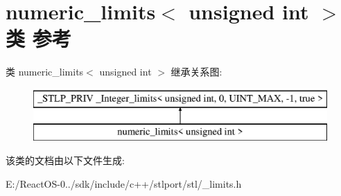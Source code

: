\hypertarget{classnumeric__limits_3_01unsigned_01int_01_4}{}\section{numeric\+\_\+limits$<$ unsigned int $>$类 参考}
\label{classnumeric__limits_3_01unsigned_01int_01_4}
类 numeric\+\_\+limits$<$ unsigned int $>$ 继承关系图\+:\begin{figure}[H]
\begin{center}
\leavevmode
\includegraphics[height=2.000000cm]{classnumeric__limits_3_01unsigned_01int_01_4}
\end{center}
\end{figure}


该类的文档由以下文件生成\+:\begin{DoxyCompactItemize}
\item 
E\+:/\+React\+O\+S-\/0../sdk/include/c++/stlport/stl/\+\_\+limits.\+h\end{DoxyCompactItemize}
